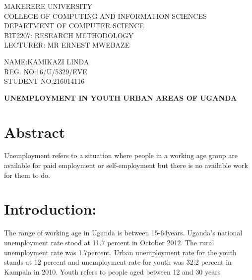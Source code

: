 \documentclass{article}                    %
\begin{document}
\begin{titlepage} %

	\centering %
	
	\scshape %
	
	\vspace*{\baselineskip} %
	
	
		
	\vspace{0.80\baselineskip} %
	
	{\LARGE MAKERERE UNIVERSITY\\ COLLEGE OF COMPUTING AND INFORMATION SCIENCES\\ DEPARTMENT OF COMPUTER SCIENCE\\BIT2207: RESEARCH METHODOLOGY\\LECTURER: MR ERNEST MWEBAZE\\} %
	
	\vspace{8.00\baselineskip} %
	

	
	
	\vspace{0.5\baselineskip} %
	
	{\scshape\Large NAME:KAMIKAZI LINDA\\REG. NO:16/U/5329/EVE\\STUDENT NO.216014116 \\} %
	
	\vspace{0.5\baselineskip} %
\end{titlepage}
\newpage
{\textbf{UNEMPLOYMENT IN YOUTH  URBAN AREAS OF UGANDA}}
\section{Abstract}
Unemployment refers to a situation where people in a working age group are available for paid employment or self-employment but there is no available work for them to do. 
\section{Introduction:  }
The range of working age in Uganda is between 15-64years. Uganda’s national unemployment rate stood at 11.7  percent in October 2012. The rural unemployment rate was 1.7percent. Urban unemployment rate for the youth stands at 12 percent and unemployment rate for youth was 32.2 percent  in Kampala in 2010. Youth refers to people aged between 12 and 30 years
\end{document}
